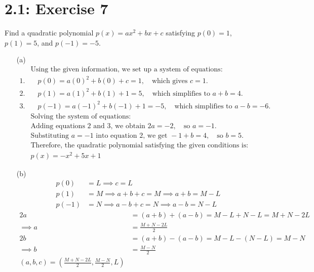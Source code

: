 \documentclass{report}
\begin{document}
\section*{2.1: Exercise 7} 

Find a quadratic polynomial $p(x) = ax^2 + bx + c$
  satisfying $p(0) = 1$, $p(1) = 5$, and $p(-1) = -5$.

\sol 

\begin{enumerate}

\item[(a)]  
\begin{align*}
& \text{Using the given information, we set up a system of equations:} \\
1. & \quad p(0) = a(0)^2 + b(0) + c = 1, \quad \text{which gives } c = 1. \\
2. & \quad p(1) = a(1)^2 + b(1) + 1 = 5, \quad \text{which simplifies to } a + b = 4. \\
3. & \quad p(-1) = a(-1)^2 + b(-1) + 1 = -5, \quad \text{which simplifies to } a - b = -6. \\
& \text{Solving the system of equations:} \\
& \text{Adding equations 2 and 3, we obtain } 2a = -2, \quad \text{so } a = -1. \\
& \text{Substituting } a = -1 \text{ into equation 2, we get } -1 + b = 4, \quad \text{so } b = 5. \\
& \text{Therefore, the quadratic polynomial satisfying the given conditions is:} \\
& \boxed{p(x) = -x^2 + 5x + 1}
\end{align*}
\item[(b)]
\begin{align*}
p(0) &= L \implies c = L \\
p(1) &= M \implies a + b + c = M \implies a + b = M - L \\
p(-1) &= N \implies a - b + c = N \implies a - b = N - L
\end{align*}
\begin{align*}
2a &= (a + b) + (a - b) = M - L + N - L = M + N - 2L \\
\implies a &= \frac{M + N - 2L}{2} \\
2b &= (a + b) - (a - b) = M - L - (N - L) = M - N \\
\implies b &= \frac{M - N}{2} \\
\boxed{(a,b,c) = (\frac{M + N - 2L}{2},\frac{M - N}{2},L)}
\end{align*}



\end{enumerate}
\end{document}
